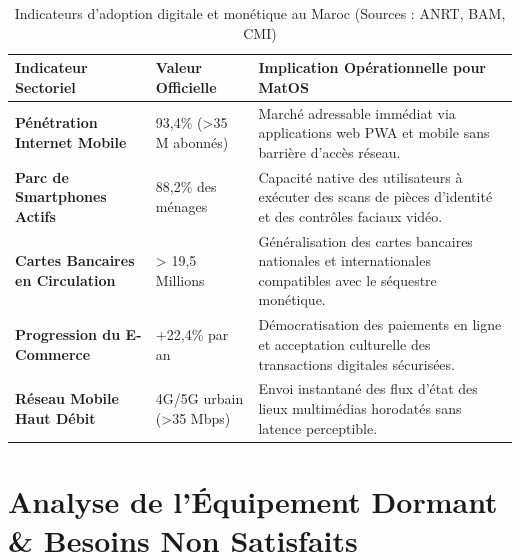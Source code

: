 \documentclass[11pt,a4paper]{report}
\begin{document}
\begin{table}[h!]
\centering
\small
\begin{tabularx}{\textwidth}{p{4.5cm} p{3cm} X}
\toprule
\textbf{Indicateur Sectoriel} & \textbf{Valeur Officielle} & \textbf{Implication Opérationnelle pour MatOS} \\
\midrule
\textbf{Pénétration Internet Mobile} & 93,4\% (>35 M abonnés) & Marché adressable immédiat via applications web PWA et mobile sans barrière d'accès réseau. \\
\addlinespace
\textbf{Parc de Smartphones Actifs} & 88,2\% des ménages & Capacité native des utilisateurs à exécuter des scans de pièces d'identité et des contrôles faciaux vidéo. \\
\addlinespace
\textbf{Cartes Bancaires en Circulation} & > 19,5 Millions & Généralisation des cartes bancaires nationales et internationales compatibles avec le séquestre monétique. \\
\addlinespace
\textbf{Progression du E-Commerce} & +22,4\% par an & Démocratisation des paiements en ligne et acceptation culturelle des transactions digitales sécurisées. \\
\addlinespace
\textbf{Réseau Mobile Haut Débit} & 4G/5G urbain (>35 Mbps) & Envoi instantané des flux d'état des lieux multimédias horodatés sans latence perceptible. \\
\bottomrule
\end{tabularx}
\caption{Indicateurs d'adoption digitale et monétique au Maroc (Sources : ANRT, BAM, CMI)}
\end{table}

\chapter{Analyse de l'Équipement Dormant \& Besoins Non Satisfaits}
\end{document}
